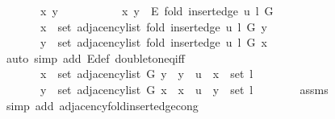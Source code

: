 \begin{isabellebody}
%
\isatagproof
{}\isamarkupfalse%
\ {\isacharminus}{\kern0pt}\isanewline
\ \ \isacommand{{\isacharbraceleft}{\kern0pt}}\isamarkupfalse%
\ \isamarkupfalse%
\ x\ y\isanewline
\ \ \ \ \isamarkupfalse%
\isanewline
\ \ \ \ \ \ {\isachardoublequoteopen}{\isacharbraceleft}{\kern0pt}x{\isacharcomma}{\kern0pt}\ y{\isacharbraceright}{\kern0pt}\ {\isasymin}\ E\ {\isacharparenleft}{\kern0pt}fold\ {\isacharparenleft}{\kern0pt}insert{\isacharunderscore}{\kern0pt}edge\ u{\isacharparenright}{\kern0pt}\ l\ G{\isacharparenright}{\kern0pt}\ {\isasymlongleftrightarrow}\isanewline
\ \ \ \ \ \ \ x\ {\isasymin}\ set\ {\isacharparenleft}{\kern0pt}adjacency{\isacharunderscore}{\kern0pt}list\ {\isacharparenleft}{\kern0pt}fold\ {\isacharparenleft}{\kern0pt}insert{\isacharunderscore}{\kern0pt}edge\ u{\isacharparenright}{\kern0pt}\ l\ G{\isacharparenright}{\kern0pt}\ y{\isacharparenright}{\kern0pt}\ {\isasymor}\isanewline
\ \ \ \ \ \ \ y\ {\isasymin}\ set\ {\isacharparenleft}{\kern0pt}adjacency{\isacharunderscore}{\kern0pt}list\ {\isacharparenleft}{\kern0pt}fold\ {\isacharparenleft}{\kern0pt}insert{\isacharunderscore}{\kern0pt}edge\ u{\isacharparenright}{\kern0pt}\ l\ G{\isacharparenright}{\kern0pt}\ x{\isacharparenright}{\kern0pt}{\isachardoublequoteclose}\isanewline
\ \ \ \ \ \ \isamarkupfalse%
\ {\isacharparenleft}{\kern0pt}auto\ simp\ add{\isacharcolon}{\kern0pt}\ E{\isacharunderscore}{\kern0pt}def\ doubleton{\isacharunderscore}{\kern0pt}eq{\isacharunderscore}{\kern0pt}iff{\isacharparenright}{\kern0pt}\isanewline
\ \ \ \ \isamarkupfalse%
\ \isamarkupfalse%
\isanewline
\ \ \ \ \ \ {\isachardoublequoteopen}{\isachardot}{\kern0pt}{\isachardot}{\kern0pt}{\isachardot}{\kern0pt}\ {\isasymlongleftrightarrow}\isanewline
\ \ \ \ \ \ \ x\ {\isasymin}\ set\ {\isacharparenleft}{\kern0pt}adjacency{\isacharunderscore}{\kern0pt}list\ G\ y{\isacharparenright}{\kern0pt}\ {\isasymor}\ {\isacharparenleft}{\kern0pt}y\ {\isacharequal}{\kern0pt}\ u\ {\isasymand}\ x\ {\isasymin}\ set\ l{\isacharparenright}{\kern0pt}\ {\isasymor}\isanewline
\ \ \ \ \ \ \ y\ {\isasymin}\ set\ {\isacharparenleft}{\kern0pt}adjacency{\isacharunderscore}{\kern0pt}list\ G\ x{\isacharparenright}{\kern0pt}\ {\isasymor}\ {\isacharparenleft}{\kern0pt}x\ {\isacharequal}{\kern0pt}\ u\ {\isasymand}\ y\ {\isasymin}\ set\ l{\isacharparenright}{\kern0pt}{\isachardoublequoteclose}\isanewline
\ \ \ \ \ \ \isamarkupfalse%
\ assms\isanewline
\ \ \ \ \ \ \isamarkupfalse%
\ {\isacharparenleft}{\kern0pt}simp\ add{\isacharcolon}{\kern0pt}\ adjacency{\isacharunderscore}{\kern0pt}fold{\isacharunderscore}{\kern0pt}insert{\isacharunderscore}{\kern0pt}edge{\isacharunderscore}{\kern0pt}cong{\isacharparenright}{\kern0pt}\isanewline

\end{isabellebody}
